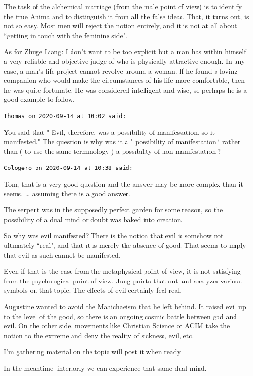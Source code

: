 \begin{footnotesize}
\begin{sffamily}
The task of the alchemical marriage (from the male point of view) is to identify the true Anima and to distinguish it from all the false ideas. That, it turns out, is not so easy. Most men will reject the notion entirely, and it is not at all about ``getting in touch with the feminine side".

As for Zhuge Liang: I don't want to be too explicit but a man has within himself a very reliable and objective judge of who is physically attractive enough. In any case, a man's life project cannot revolve around a woman. If he found a loving companion who would make the circumstances of his life more comfortable, then he was quite fortunate. He was considered intelligent and wise, so perhaps he is a good example to follow.


\hfill

\texttt{Thomas on 2020-09-14 at 10:02 said: }

You said that " Evil, therefore, was a possibility of manifestation, so it manifested." The question is why was it a " possibility of manifestation ‘ rather than ( to use the same terminology ) a possibility of non-manifestation ?


\hfill

\texttt{Cologero on 2020-09-14 at 10:38 said: }

Tom, that is a very good question and the answer may be more complex than it seems. … assuming there is a good answer.

The serpent was in the supposedly perfect garden for some reason, so the possibility of a dual mind or doubt was baked into creation.

So why was evil manifested? There is the notion that evil is somehow not ultimately ``real", and that it is merely the absence of good. That seems to imply that evil as such cannot be manifested.

Even if that is the case from the metaphysical point of view, it is not satisfying from the psychological point of view. Jung points that out and analyzes various symbols on that topic. The effects of evil certainly feel real.

Augustine wanted to avoid the Manichaeism that he left behind. It raised evil up to the level of the good, so there is an ongoing cosmic battle between god and evil. On the other side, movements like Christian Science or ACIM take the notion to the extreme and deny the reality of sickness, evil, etc.

I'm gathering material on the topic will post it when ready.

In the meantime, interiorly we can experience that same dual mind.


\hfill


\end{sffamily}\end{footnotesize}
